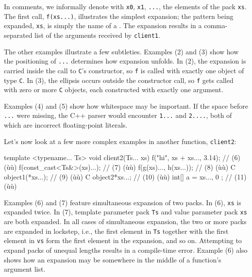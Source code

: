 \noindent In comments, we informally denote with \lstinline!x0!, \lstinline!x1!,
\lstinline!...!, the elements of the pack \lstinline!xs!. The first call,
\lstinline!f(xs...)!, illustrates the simplest expansion; the pattern being
expanded, \lstinline!xs!, is simply the name of a . The expansion results in a comma-separated list of the
arguments received by \lstinline!client1!.

The other examples illustrate a few subtleties. Examples (2) and (3)
show how the positioning of \lstinline!...! determines how expansion
unfolds. In (2), the expansion is carried inside the call to
\lstinline!C!'s constructor, so \lstinline!f! is called with exactly one
object of type \lstinline!C!. In (3), the ellipsis occurs outside the
constructor call, so \lstinline!f! gets called with zero or more \lstinline!C!
objects, each constructed with exactly one argument.

Examples (4) and (5) show how whitespace may be important. If the space
before \lstinline!...! were missing, the C++ parser would encounter
\lstinline!1...! and \lstinline!2....!, both of which are incorrect
floating-point literals.

Let's now look at a few more complex examples in another function,
\lstinline!client2!:

\begin{emcppslisting}
template <typename... Ts>
void client2(Ts... xs)
{
    f("hi", xs + xs..., 3.14);  // (6) (ù{}ù)
    f(const_cast<Ts&>(xs)...);  // (7) (ù{}ù)
    f(g(xs)..., h(xs...));      // (8) (ù{}ù)
    C object1(*xs...);          // (9) (ù{}ù)
    C object2{*xs...};          // (10) (ù{}ù)
    int[] a = { xs..., 0 };     // (11) (ù{}ù)
}
\end{emcppslisting}
    

\noindent Examples (6) and (7) feature simultaneous expansion of two packs. In
(6), \lstinline!xs! is expanded twice. In (7), template parameter pack
\lstinline!Ts! and value parameter pack \lstinline!xs! are both expanded. In
all cases of simultaneous expansion, the two or more packs are expanded
in lockstep, i.e., the first element in \lstinline!Ts! together with the
first element in \lstinline!vs! form the first element in the expansion,
and so on. Attempting to expand packs of unequal lengths results in a
compile-time error. Example (6) also shows how an expansion may be
somewhere in the middle of a function's argument list.

